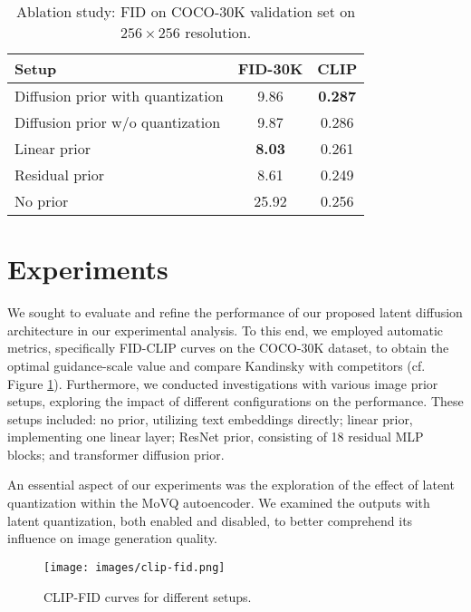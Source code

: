 \documentclass[11pt]{article}
\begin{document}
\begin{table}
\small 
  \caption{Ablation study: FID on COCO-30K validation set on $256 \times 256$ resolution.}
  \label{fid_clip_table}
  \centering
  \begin{tabular}{lcc}
    \hline
    \textbf{Setup} & \textbf{FID-30K} & \textbf{CLIP}\\ \hline
    Diffusion prior with quantization & 9.86 & \textbf{0.287} \\
    Diffusion prior w/o quantization & 9.87 & 0.286\\
    Linear prior & \textbf{8.03} & 0.261\\
    Residual prior & 8.61 & 0.249\\
    No prior & 25.92 & 0.256\\


    \hline
  \end{tabular}
\end{table}



\section{Experiments}





We sought to evaluate and refine the performance of our proposed latent diffusion architecture in our experimental analysis. To this end, we employed automatic metrics, specifically FID-CLIP curves on the COCO-30K dataset, to obtain the optimal guidance-scale value and compare Kandinsky with competitors (cf. Figure \ref{fid-clip}). Furthermore, we conducted investigations with various image prior setups, exploring the impact of different configurations on the performance. These setups included: no prior, utilizing text embeddings directly; linear prior, implementing one linear layer; ResNet prior, consisting of 18 residual MLP blocks; and transformer diffusion prior.

An essential aspect of our experiments was the exploration of the effect of latent quantization within the MoVQ autoencoder. We examined the outputs with latent quantization, both enabled and disabled, to better comprehend its influence on image generation quality.

\begin{figure}
  \centering
  \texttt{[image: images/clip-fid.png]}
  \caption{CLIP-FID curves for different setups.}
  \label{fid-clip}
\end{figure}
\end{document}
